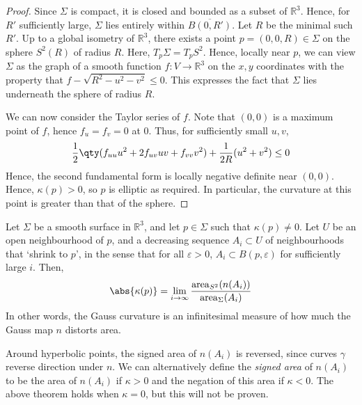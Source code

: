 \begin{proof}
	Since $\Sigma$ is compact, it is closed and bounded as a subset of $\mathbb R^3$.
	Hence, for $R'$ sufficiently large, $\Sigma$ lies entirely within $\overline{B(0,R')}$.
	Let $R$ be the minimal such $R'$.
	Up to a global isometry of $\mathbb R^3$, there exists a point $p = (0,0,R) \in \Sigma$ on the sphere $S^2(R)$ of radius $R$.
	Here, $T_p \Sigma = T_p S^2$.
	Hence, locally near $p$, we can view $\Sigma$ as the graph of a smooth function $f \colon V \to \mathbb R^3$ on the $x, y$ coordinates with the property that $f - \sqrt{R^2 - u^2 - v^2} \leq 0$.
	This expresses the fact that $\Sigma$ lies underneath the sphere of radius $R$.

	We can now consider the Taylor series of $f$.
	Note that $(0,0)$ is a maximum point of $f$, hence $f_u = f_v = 0$ at $0$.
	Thus, for sufficiently small $u,v$,
	\begin{align*}
		\frac{1}{2} \qty(f_{uu} u^2 + 2f_{uv} uv + f_{vv} v^2) + \frac{1}{2R} (u^2 + v^2) \leq 0
	\end{align*}
	Hence, the second fundamental form is locally negative definite near $(0,0)$.
	Hence, $\kappa(p) > 0$, so $p$ is elliptic as required.
	In particular, the curvature at this point is greater than that of the sphere.
\end{proof}

\begin{theorem}
	Let $\Sigma$ be a smooth surface in $\mathbb R^3$, and let $p \in \Sigma$ such that $\kappa(p) \neq 0$.
	Let $U$ be an open neighbourhood of $p$, and a decreasing sequence $A_i \subset U$ of neighbourhoods that `shrink to $p$', in the sense that for all $\varepsilon > 0$, $A_i \subset B(p,\varepsilon)$ for sufficiently large $i$.
	Then,
	\begin{align*}
		\abs{\kappa(p)} = \lim_{i \to \infty} \frac{\mathrm{area}_{S^2} (n(A_i))}{\mathrm{area}_{\Sigma} (A_i)}
	\end{align*}
	In other words, the Gauss curvature is an infinitesimal measure of how much the Gauss map $n$ distorts area.
\end{theorem}

\begin{remark}
	Around hyperbolic points, the signed area of $n(A_i)$ is reversed, since curves $\gamma$ reverse direction under $n$.
	We can alternatively define the \textit{signed area} of $n(A_i)$ to be the area of $n(A_i)$ if $\kappa > 0$ and the negation of this area if $\kappa < 0$.
	The above theorem holds when $\kappa = 0$, but this will not be proven.
\end{remark}

